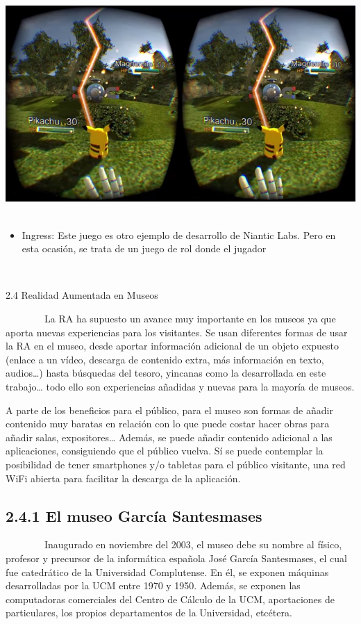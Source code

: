 \documentclass[]{article}
\begin{document}
~~~~~~~~\includegraphics{images/image21.jpg}~~~~~~~~

\begin{itemize}
\itemsep1pt\parskip0pt
\item
  Ingress: Este juego es otro ejemplo de desarrollo de Niantic Labs.
  Pero en esta ocasión, se trata de un juego de rol donde el jugador
\end{itemize}

~

2.4 Realidad Aumentada en Museos

~~~~~~~~La RA ha supuesto un avance muy importante en los museos ya que
aporta nuevas experiencias para los visitantes. Se usan diferentes
formas de usar la RA en el museo, desde aportar información adicional de
un objeto expuesto (enlace a un vídeo, descarga de contenido extra, más
información en texto, audios\ldots{}) hasta búsquedas del tesoro,
yincanas como la desarrollada en este trabajo\ldots{} todo ello son
experiencias añadidas y nuevas para la mayoría de museos.

A parte de los beneficios para el público, para el museo son formas de
añadir contenido muy baratas en relación con lo que puede costar hacer
obras para añadir salas, expositores\ldots{} Además, se puede añadir
contenido adicional a las aplicaciones, consiguiendo que el público
vuelva. Sí se puede contemplar la posibilidad de tener smartphones y/o
tabletas para el público visitante, una red WiFi abierta para facilitar
la descarga de la aplicación.

\subsection{2.4.1 El museo García Santesmases}\label{h.w6fqwheeko74}

~~~~~~~~Inaugurado en noviembre del 2003, el museo debe su nombre al
físico, profesor y precursor de la informática española José García
Santesmases, el cual fue catedrático de la Universidad Complutense. En
él, se exponen máquinas desarrolladas por la UCM entre 1970 y 1950.
Además, se exponen las computadoras comerciales del Centro de Cálculo de
la UCM, aportaciones de particulares, los propios departamentos de la
Universidad, etcétera.
\end{document}
